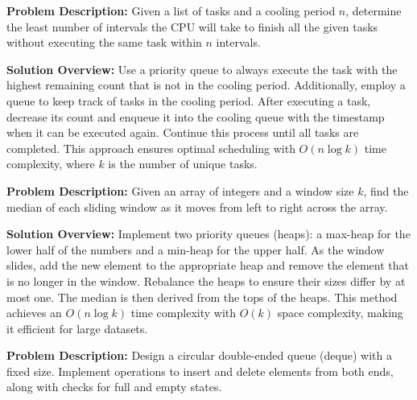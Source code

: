 
\textbf{Problem Description:}  
Given a list of tasks and a cooling period \(n\), determine the least number of intervals the CPU will take to finish all the given tasks without executing the same task within \(n\) intervals.

\textbf{Solution Overview:}  
Use a priority queue to always execute the task with the highest remaining count that is not in the cooling period. Additionally, employ a queue to keep track of tasks in the cooling period. After executing a task, decrease its count and enqueue it into the cooling queue with the timestamp when it can be executed again. Continue this process until all tasks are completed. This approach ensures optimal scheduling with \(O(n \log k)\) time complexity, where \(k\) is the number of unique tasks.


\textbf{Problem Description:}  
Given an array of integers and a window size \(k\), find the median of each sliding window as it moves from left to right across the array.

\textbf{Solution Overview:}  
Implement two priority queues (heaps): a max-heap for the lower half of the numbers and a min-heap for the upper half. As the window slides, add the new element to the appropriate heap and remove the element that is no longer in the window. Rebalance the heaps to ensure their sizes differ by at most one. The median is then derived from the tops of the heaps. This method achieves an \(O(n \log k)\) time complexity with \(O(k)\) space complexity, making it efficient for large datasets.


\textbf{Problem Description:}  
Design a circular double-ended queue (deque) with a fixed size. Implement operations to insert and delete elements from both ends, along with checks for full and empty states.

